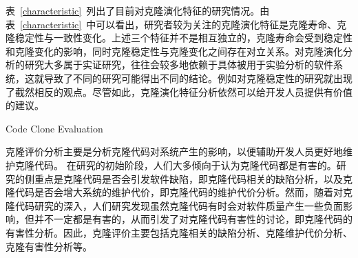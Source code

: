 表~\ref{characteristic}~列出了目前对克隆演化特征的研究情况。由表~\ref{characteristic}~中可以看出，研究者较为关注的克隆演化特征是克隆寿命、克隆稳定性与一致性变化。上述三个特征并不是相互独立的，克隆寿命会受到稳定性和克隆变化的影响，同时克隆稳定性与克隆变化之间存在对立关系。对克隆演化分析的研究大多属于实证研究，往往会较多地依赖于具体被用于实验分析的软件系统，这就导致了不同的研究可能得出不同的结论。例如对克隆稳定性的研究就出现了截然相反的观点。尽管如此，克隆演化特征分析依然可以给开发人员提供有价值的建议。

{Code Clone Evaluation}

克隆评价分析主要是分析克隆代码对系统产生的影响，以便辅助开发人员更好地维护克隆代码。%
在研究的初始阶段，人们大多倾向于认为克隆代码都是有害的。研究的侧重点是克隆代码是否会引发软件缺陷，即克隆代码相关的缺陷分析，以及克隆代码是否会增大系统的维护代价，即克隆代码的维护代价分析。然而，随着对克隆代码研究的深入，人们研究发现虽然克隆代码有时会对软件质量产生一些负面影响，但并不一定都是有害的，从而引发了对克隆代码有害性的讨论，即克隆代码的有害性分析。因此，克隆评价主要包括克隆相关的缺陷分析、克隆维护代价分析、克隆有害性分析等。



